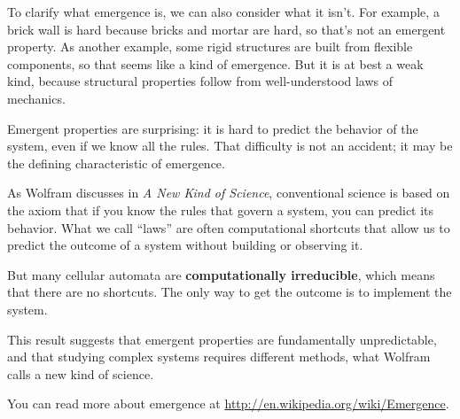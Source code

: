 \documentclass[10pt]{book}
\begin{document}
To clarify what emergence is, we can also consider what it isn't.  For
example, a brick wall is hard because bricks and mortar are hard, so
that's not an emergent property.  As another example, some rigid
structures are built from flexible components, so that seems like
a kind of emergence.  But it is at best a weak kind,
because structural properties follow from well-understood laws of
mechanics.

Emergent properties are surprising: it is hard to predict the behavior
of the system, even if we know all the rules.  That difficulty is not
an accident; it may be the defining characteristic of emergence.

As Wolfram discusses in {\em A New Kind of Science}, conventional science
is based on the axiom that if you know the rules that govern a system,
you can predict its behavior.  What we call ``laws'' are often
computational shortcuts that allow us to predict the outcome of a
system without building or observing it.

But many cellular automata are {\bf computationally irreducible},
which means that there are no shortcuts.  The only way to get the
outcome is to implement the system.

This result suggests that emergent properties are fundamentally
unpredictable, and that studying complex systems requires different
methods, what Wolfram calls a new kind of science.

You can read more about emergence at
\url{http://en.wikipedia.org/wiki/Emergence}.






\printindex


\end{document}
